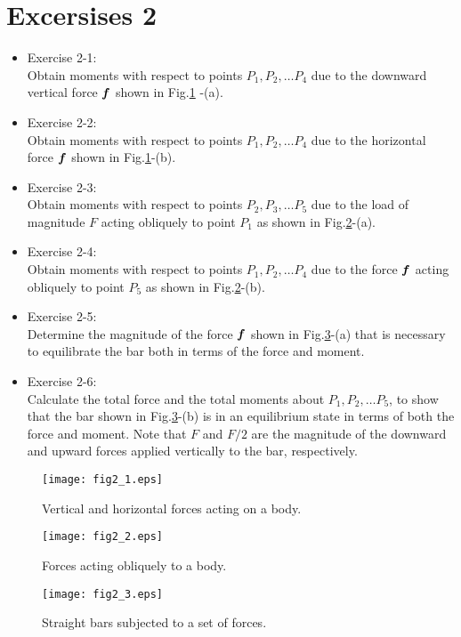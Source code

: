 \documentclass[10pt,a4j]{article}
\begin{document}
\section*{Excersises 2}
\begin{itemize}
\item
Exercise 2-1:\\
Obtain moments with respect to points $P_1,P_2,\dots P_4$ due to the downward 
vertical force $\mbox{\boldmath $f$}$ shown in Fig.\ref{fig:fig2_1} -(a).
\item
Exercise 2-2:\\
Obtain moments with respect to points $P_1,P_2,\dots P_4$ due to 
the horizontal force $\mbox{\boldmath $f$}$ shown in Fig.\ref{fig:fig2_1}-(b). 
\item
Exercise 2-3:\\
Obtain moments with respect to points $P_2,P_3,\dots P_5$
due to the load of magnitude $F$ acting obliquely to point $P_1$ 
as shown in Fig.\ref{fig:fig2_2}-(a).
\item
Exercise 2-4:\\
Obtain moments with respect to points $P_1,P_2,\dots P_4$
 due to the force $\mbox{\boldmath $f$}$ acting obliquely to point $P_5$ as 
		shown in Fig.\ref{fig:fig2_2}-(b).
\item
Exercise 2-5:\\
	Determine the magnitude of the force $\mbox{\boldmath $f$}$ shown in 
	Fig.\ref{fig:fig2_3}-(a) that is necessary to equilibrate 
	the bar both in terms of the force and moment. 
\item
Exercise 2-6:\\
	Calculate the total force and the total moments about $P_1, P_2,\dots P_5$, 
	to show that the bar shown in Fig.\ref{fig:fig2_3}-(b) is in an equilibrium state 
	in terms of both the force and moment. 
	Note that $F$ and $F/2$ are the magnitude of the downward and upward forces 
	applied vertically to the bar, respectively.
\end{itemize}
\newpage
\begin{figure}[h]
	\begin{center}
	\texttt{[image: fig2\_1.eps]} 
	\end{center}
	\caption{Vertical and horizontal forces acting on a body.} 
	\label{fig:fig2_1}
\end{figure}
\begin{figure}[h]
	\begin{center}
	\texttt{[image: fig2\_2.eps]} 
	\end{center}
	\caption{Forces acting obliquely to a body.} 
	\label{fig:fig2_2}
\end{figure}
\begin{figure}[h]
	\begin{center}
	\texttt{[image: fig2\_3.eps]} 
	\end{center}
	\caption{Straight bars subjected to a set of forces.} 
	\label{fig:fig2_3}
\end{figure}
\end{document}
